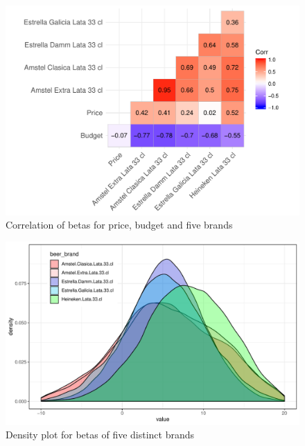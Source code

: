 \documentclass[12pt,a4paper]{article}
\begin{document}
\begin{figure}[ht]
	\centering
  \includegraphics[scale = 0.7]{figures/corrplot_betas_five.pdf}
	\caption{Correlation of betas for price, budget and five brands}
	\label{fig_corr_five}
\end{figure}

\begin{figure}[ht]
	\centering
  \includegraphics[scale = 0.6]{figures/dens_betas_five_in_one.pdf}
	\caption{Density plot for betas of five distinct brands}
	\label{fig_dens_five}
\end{figure}
\end{document}
